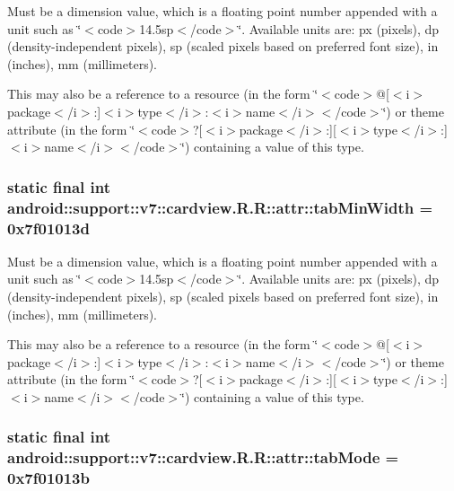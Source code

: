Must be a dimension value, which is a floating point number appended with a unit such as \char`\"{}$<$code$>$14.5sp$<$/code$>$\char`\"{}. Available units are: px (pixels), dp (density-independent pixels), sp (scaled pixels based on preferred font size), in (inches), mm (millimeters). 

This may also be a reference to a resource (in the form \char`\"{}$<$code$>$@\mbox{[}$<$i$>$package$<$/i$>$:\mbox{]}$<$i$>$type$<$/i$>$:$<$i$>$name$<$/i$>$$<$/code$>$\char`\"{}) or theme attribute (in the form \char`\"{}$<$code$>$?\mbox{[}$<$i$>$package$<$/i$>$:\mbox{]}\mbox{[}$<$i$>$type$<$/i$>$:\mbox{]}$<$i$>$name$<$/i$>$$<$/code$>$\char`\"{}) containing a value of this type. \hypertarget{classandroid_1_1support_1_1v7_1_1cardview_1_1_r_1_1attr_94555557b32c6757ce9093d84d6eb2c9}{
\subsubsection[{tabMinWidth}]{\setlength{\rightskip}{0pt plus 5cm}static final int android::support::v7::cardview.R.R::attr::tabMinWidth = 0x7f01013d}}
\label{classandroid_1_1support_1_1v7_1_1cardview_1_1_r_1_1attr_94555557b32c6757ce9093d84d6eb2c9}


Must be a dimension value, which is a floating point number appended with a unit such as \char`\"{}$<$code$>$14.5sp$<$/code$>$\char`\"{}. Available units are: px (pixels), dp (density-independent pixels), sp (scaled pixels based on preferred font size), in (inches), mm (millimeters). 

This may also be a reference to a resource (in the form \char`\"{}$<$code$>$@\mbox{[}$<$i$>$package$<$/i$>$:\mbox{]}$<$i$>$type$<$/i$>$:$<$i$>$name$<$/i$>$$<$/code$>$\char`\"{}) or theme attribute (in the form \char`\"{}$<$code$>$?\mbox{[}$<$i$>$package$<$/i$>$:\mbox{]}\mbox{[}$<$i$>$type$<$/i$>$:\mbox{]}$<$i$>$name$<$/i$>$$<$/code$>$\char`\"{}) containing a value of this type. \hypertarget{classandroid_1_1support_1_1v7_1_1cardview_1_1_r_1_1attr_b55b244d34b62573db40073e19cb5126}{
\subsubsection[{tabMode}]{\setlength{\rightskip}{0pt plus 5cm}static final int android::support::v7::cardview.R.R::attr::tabMode = 0x7f01013b}}
\label{classandroid_1_1support_1_1v7_1_1cardview_1_1_r_1_1attr_b55b244d34b62573db40073e19cb5126}


